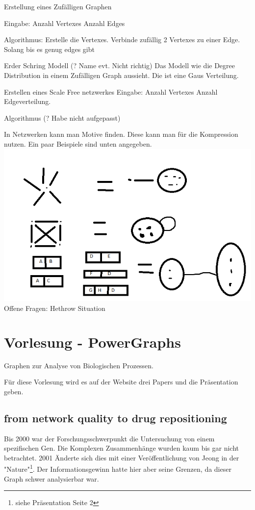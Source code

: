 \documentclass{article}
\begin{document}
Erstellung eines Zufälligen Graphen

Eingabe:
Anzahl Vertexes
Anzahl Edges

Algorithmus:
Erstelle die Vertexes.
Verbinde zufällig 2 Vertexes zu einer Edge. Solang bis es genug edges gibt

Erder Schring Modell (? Name evt. Nicht richtig)
Das Modell wie die Degree Distribution in einem Zufälligen Graph aussieht. Die ist eine Gaus Verteilung. 


Erstellen eines Scale Free netzwerkes
Eingabe:
Anzahl Vertexes
Anzahl Edgeverteilung.

Algorithmus (? Habe nicht aufgepasst)


In Netzwerken kann man Motive finden. Diese kann man für die Kompression nutzen. Ein paar Beispiele sind unten angegeben.\\
\includegraphics[scale=0.5]{graphvereinfachungen}\\

Offene Fragen:
Hethrow Situation

\newpage
\section{Vorlesung - PowerGraphs}
Graphen zur Analyse von Biologischen Prozessen. 

Für diese Vorlesung wird es auf der Website drei Papers und die Präsentation geben.
\subsection{from network quality to drug repositioning}
Bis 2000 war der Forschungsschwerpunkt die Untersuchung von einem spezifischen Gen.
Die Komplexen Zusammenhänge wurden kaum bis gar nicht betrachtet. 
2001 Änderte sich dies mit einer Veröffentlichung von Jeong in der "Nature"\footnote{siehe Präsentation Seite 2}. 
Der Informationsgewinn hatte hier aber seine Grenzen, da dieser Graph schwer analysierbar war.
\\
\end{document}
